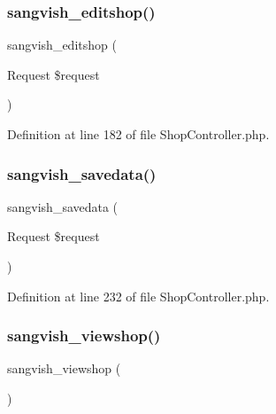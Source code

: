 \mbox{\label{class_responsive_1_1_http_1_1_controllers_1_1_shop_controller_a91ccb31ea3618b9969dcd4bca9108803}} 
\subsubsection{\texorpdfstring{sangvish\_editshop()}{sangvish\_editshop()}}
{\footnotesize\ttfamily sangvish\+\_\+editshop (\begin{DoxyParamCaption}\item[{Request}]{\$request }\end{DoxyParamCaption})}



Definition at line 182 of file Shop\+Controller.\+php.

\mbox{\label{class_responsive_1_1_http_1_1_controllers_1_1_shop_controller_a63d8d498a130e9f530dd9de0247a0c74}} 
\subsubsection{\texorpdfstring{sangvish\_savedata()}{sangvish\_savedata()}}
{\footnotesize\ttfamily sangvish\+\_\+savedata (\begin{DoxyParamCaption}\item[{Request}]{\$request }\end{DoxyParamCaption})\hspace{0.3cm}{\ttfamily [protected]}}



Definition at line 232 of file Shop\+Controller.\+php.

\mbox{\label{class_responsive_1_1_http_1_1_controllers_1_1_shop_controller_af27a6de05f3ac755be3346d89b118a84}} 
\subsubsection{\texorpdfstring{sangvish\_viewshop()}{sangvish\_viewshop()}}
{\footnotesize\ttfamily sangvish\+\_\+viewshop (\begin{DoxyParamCaption}{ }\end{DoxyParamCaption})}



